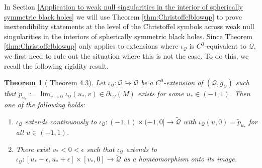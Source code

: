 \documentclass{article}
\newcommand{\Q}{\mathcal{Q}}
\newcommand{\Sp}{\mathbb{S}}
\newcommand{\id}{\mathrm{id}}
\newcommand{\Mw}{M_{\mathrm{wns}}}
\newtheorem{remark}[definition]{Remark}
\newtheorem{thm}[definition]{Theorem}
\begin{document}
In Section \ref{Application to  weak null singularities in the interior of spherically symmetric black holes} we will use Theorem \ref{thm:Christoffelblowup} to prove inextendibility statements at the level of the Christoffel symbols across weak null singularities in the interiors of spherically symmetric black holes. Since Theorem \ref{thm:Christoffelblowup} only applies to extensions where $\iota_\Q$ is $C^0$-equivalent to $\overline{\Q}$, we first need to rule out the situation where this is not the case. To do this, we recall the following rigidity result. 
\begin{thm}[\cite{CameronSbierski} Theorem 4.3]\label{thm:boundaryrigidity}
  Let $\iota_\Q : \Q \hookrightarrow \tilde{\Q}$ be a $C^0$-extension of $(\Q,g_\Q)$ such that $\tilde{p}_{u_*}:=\lim_{v \to 0} \iota_\Q (u_*,v) \in \partial \iota_{\Q}(M)$ exists for some $u_*\in(-1,1)$. Then one of the following holds:
    \begin{enumerate}
        \item[(a)] $\iota_\Q$ extends continuously to $\iota_\Q : (-1,1) \times (-1,0] \to 
        \tilde{\Q}$ with $\iota_\Q(u,0) = \tilde{p}_{u_*}$ for all $u \in (-1,1)$. 
        \item[(b)] 
        There exist $v_*<0<\epsilon$
        such that $\iota_\Q$ extends to $\iota_\Q : [u_*-\epsilon, u_*+\epsilon] \times [v_*,0] \to \tilde{\Q}$ as a homeomorphism onto its image.
    \end{enumerate}
\end{thm}

\end{document}
